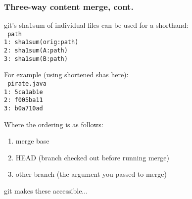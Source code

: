 \documentclass[t]{beamer}
\begin{document}
\begin{frame}
{    
  }

\end{frame}


\begin{frame}
  \frametitle{Three-way content merge, cont.}

  git's sha1sum of individual files can be used for a shorthand:\\
    {\footnotesize\texttt{%
    \hspace*{0.6em} path\\
    1:\ sha1sum(orig:path)\\
    2:\ sha1sum(A:path)\\
    3:\ sha1sum(B:path)\\[\baselineskip]
    }}

  \pause

  For example (using shortened shas here):\\
    {\footnotesize\texttt{%
    \hspace*{0.6em} pirate.java\\
    1:\ 5ca1ab1e\\
    2:\ f005ba11\\
    3:\ b0a710ad\\[\baselineskip]
    }}

  \pause

  Where the ordering is as follows:
  {\footnotesize
  \begin{enumerate}
    \item merge base
    \item HEAD (branch checked out before running merge)
    \item other branch (the argument you passed to merge)
  \end{enumerate}
  }

  \pause

  \vspace*{0.5\baselineskip}
  git makes these accessible...

\end{frame}
\end{document}
